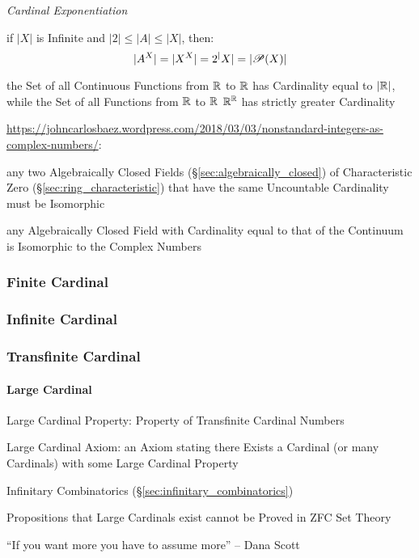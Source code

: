 \emph{Cardinal Exponentiation}

if $|X|$ is Infinite and $|2| \leq |A| \leq |X|$, then:
\[
  |A^X| = |X^X| = 2^|X| = |\mathscr{P}(X)|
\]

the Set of all Continuous Functions from $\mathbb{R}$ to $\mathbb{R}$ has Cardinality
equal to $|\mathbb{R}|$, while the Set of all Functions from $\mathbb{R}$ to $\mathbb{R}$
$\mathbb{R}^{\mathbb{R}}$ has strictly greater Cardinality

\url{https://johncarlosbaez.wordpress.com/2018/03/03/nonstandard-integers-as-complex-numbers/}:

any two Algebraically Closed Fields (\S\ref{sec:algebraically_closed}) of
Characteristic Zero (\S\ref{sec:ring_characteristic}) that have the same
Uncountable Cardinality must be Isomorphic

any Algebraically Closed Field with Cardinality equal to that of the Continuum
is Isomorphic to the Complex Numbers



\subsubsection{Finite Cardinal}\label{sec:finite_cardinal}

\subsubsection{Infinite Cardinal}\label{sec:infinite_cardinal}

\subsubsection{Transfinite Cardinal}\label{sec:transfinite_cardinal}

\paragraph{Large Cardinal}\label{sec:large_cardinal}\hfill

Large Cardinal Property: Property of Transfinite Cardinal Numbers

Large Cardinal Axiom: an Axiom stating there Exists a Cardinal (or
many Cardinals) with some Large Cardinal Property

Infinitary Combinatorics (\S\ref{sec:infinitary_combinatorics})

Propositions that Large Cardinals exist cannot be Proved in ZFC Set
Theory

``If you want more you have to assume more'' -- Dana Scott



